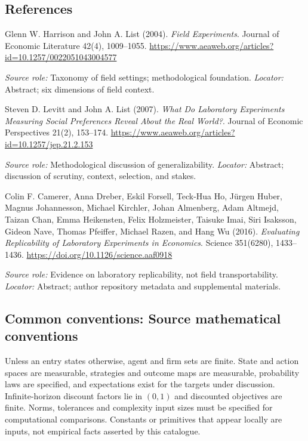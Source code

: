\documentclass[11pt,a4paper]{article}
\begin{document}
\subsection*{References}

\begin{enumerate}[label={[S\arabic*]},leftmargin=*]

\item Glenn W. Harrison and John A. List (2004). \emph{Field Experiments}. Journal of Economic Literature 42(4), 1009--1055. \url{https://www.aeaweb.org/articles?id=10.1257/0022051043004577}\par \textit{Source role:} Taxonomy of field settings; methodological foundation. \textit{Locator:} Abstract; six dimensions of field context.

\item Steven D. Levitt and John A. List (2007). \emph{What Do Laboratory Experiments Measuring Social Preferences Reveal About the Real World?}. Journal of Economic Perspectives 21(2), 153--174. \url{https://www.aeaweb.org/articles?id=10.1257/jep.21.2.153}\par \textit{Source role:} Methodological discussion of generalizability. \textit{Locator:} Abstract; discussion of scrutiny, context, selection, and stakes.

\item Colin F. Camerer, Anna Dreber, Eskil Forsell, Teck-Hua Ho, Jürgen Huber, Magnus Johannesson, Michael Kirchler, Johan Almenberg, Adam Altmejd, Taizan Chan, Emma Heikensten, Felix Holzmeister, Taisuke Imai, Siri Isaksson, Gideon Nave, Thomas Pfeiffer, Michael Razen, and Hang Wu (2016). \emph{Evaluating Replicability of Laboratory Experiments in Economics}. Science 351(6280), 1433--1436. \url{https://doi.org/10.1126/science.aaf0918}\par \textit{Source role:} Evidence on laboratory replicability, not field transportability. \textit{Locator:} Abstract; author repository metadata and supplemental materials.

\end{enumerate}

\subsection*{Common conventions: Source mathematical conventions}

Unless an entry states otherwise, agent and firm sets are finite. State and action spaces are measurable, strategies and outcome maps are measurable, probability laws are specified, and expectations exist for the targets under discussion. Infinite-horizon discount factors lie in $(0,1)$ and discounted objectives are finite. Norms, tolerances and complexity input sizes must be specified for computational comparisons. Constants or primitives that appear locally are inputs, not empirical facts asserted by this catalogue.
\end{document}
